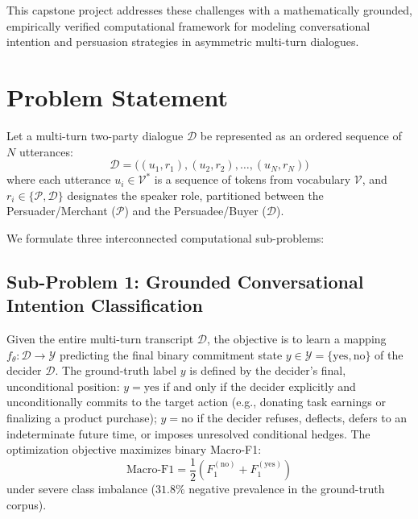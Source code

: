 This capstone project addresses these challenges with a mathematically grounded, empirically verified computational framework for modeling conversational intention and persuasion strategies in asymmetric multi-turn dialogues.

\section{Problem Statement}
\label{sec:problem-statement}

\begin{summarybox}
Let a multi-turn two-party dialogue $\mathcal{D}$ be represented as an ordered sequence of $N$ utterances:
\begin{equation}
  \mathcal{D} = \big( (u_1, r_1), (u_2, r_2), \dots, (u_N, r_N) \big)
\end{equation}
where each utterance $u_i \in \mathcal{V}^*$ is a sequence of tokens from vocabulary $\mathcal{V}$, and $r_i \in \{\mathcal{P}, \mathcal{D}\}$ designates the speaker role, partitioned between the Persuader/Merchant ($\mathcal{P}$) and the Persuadee/Buyer ($\mathcal{D}$).
\end{summarybox}

We formulate three interconnected computational sub-problems:

\subsection{Sub-Problem 1: Grounded Conversational Intention Classification}
Given the entire multi-turn transcript $\mathcal{D}$, the objective is to learn a mapping $f_\theta: \mathcal{D} \to \mathcal{Y}$ predicting the final binary commitment state $y \in \mathcal{Y} = \{\text{yes}, \text{no}\}$ of the decider $\mathcal{D}$. The ground-truth label $y$ is defined by the decider's final, unconditional position: $y = \text{yes}$ if and only if the decider explicitly and unconditionally commits to the target action (e.g., donating task earnings or finalizing a product purchase); $y = \text{no}$ if the decider refuses, deflects, defers to an indeterminate future time, or imposes unresolved conditional hedges. The optimization objective maximizes binary Macro-F1:
\begin{equation}
  \text{Macro-F1} = \frac{1}{2} \left( F_1^{(\text{no})} + F_1^{(\text{yes})} \right)
\end{equation}
under severe class imbalance ($31.8\%$ negative prevalence in the ground-truth corpus).

